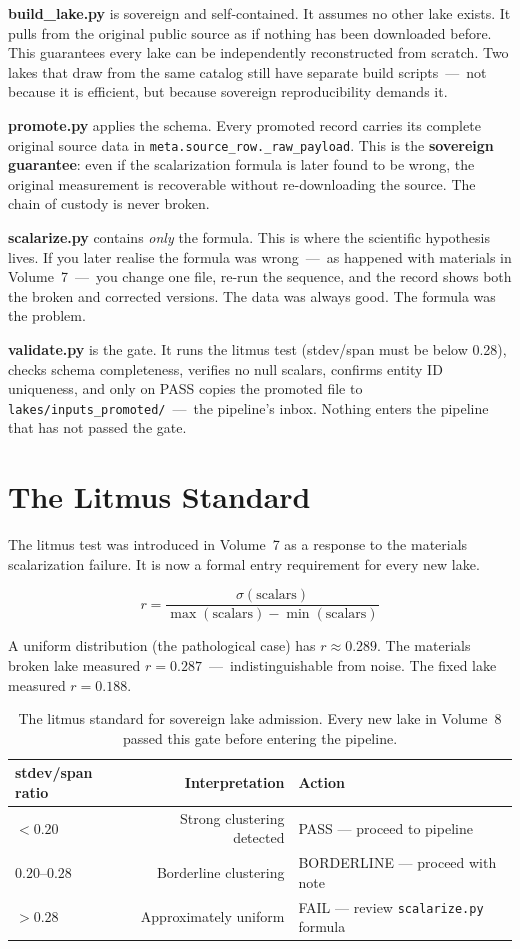 \documentclass[11pt, letterpaper, openany]{book}
\begin{document}
\textbf{build\_lake.py} is sovereign and self-contained. It assumes no other lake
exists. It pulls from the original public source as if nothing has been downloaded
before. This guarantees every lake can be independently reconstructed from scratch.
Two lakes that draw from the same catalog still have separate build scripts~---~not
because it is efficient, but because sovereign reproducibility demands it.

\textbf{promote.py} applies the schema. Every promoted record carries its complete
original source data in \texttt{meta.source\_row.\_raw\_payload}. This is the
\textbf{sovereign guarantee}: even if the scalarization formula is later found to
be wrong, the original measurement is recoverable without re-downloading the source.
The chain of custody is never broken.

\textbf{scalarize.py} contains \emph{only} the formula. This is where the
scientific hypothesis lives. If you later realise the formula was wrong~---~as
happened with materials in Volume~7~---~you change one file, re-run the sequence,
and the record shows both the broken and corrected versions. The data was always
good. The formula was the problem.

\textbf{validate.py} is the gate. It runs the litmus test (stdev/span must be
below 0.28), checks schema completeness, verifies no null scalars, confirms entity
ID uniqueness, and only on PASS copies the promoted file to
\texttt{lakes/inputs\_promoted/}~---~the pipeline's inbox. Nothing enters the
pipeline that has not passed the gate.

\section{The Litmus Standard}

The litmus test was introduced in Volume~7 as a response to the materials
scalarization failure. It is now a formal entry requirement for every new lake.

\[
r = \frac{\sigma(\text{scalars})}{\max(\text{scalars}) - \min(\text{scalars})}
\]

A uniform distribution (the pathological case) has $r \approx 0.289$. The
materials broken lake measured $r = 0.287$~---~indistinguishable from noise. The
fixed lake measured $r = 0.188$.

\begin{table}[H]
\centering
\renewcommand{\arraystretch}{1.3}
\begin{tabular}{|l|r|l|}
\hline
\rowcolor{kishblue!10}
\textbf{stdev/span ratio} & \textbf{Interpretation} & \textbf{Action} \\
\hline\hline
$< 0.20$ & Strong clustering detected & PASS --- proceed to pipeline \\
$0.20$--$0.28$ & Borderline clustering & BORDERLINE --- proceed with note \\
$> 0.28$ & Approximately uniform & FAIL --- review \texttt{scalarize.py} formula \\
\hline
\end{tabular}
\caption{The litmus standard for sovereign lake admission. Every new lake in
Volume~8 passed this gate before entering the pipeline.}
\label{tab:litmus}
\end{table}
\end{document}
